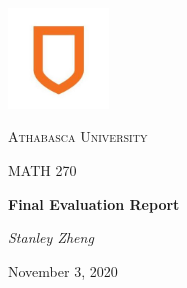 \documentclass[12pt, letterpaper, twoside]{article}
\begin{document}
\begin{titlepage}
\centering
\vspace*{60px}
\hspace{0pt}
\includegraphics[width=0.2\textwidth]{logo}\par\vspace{1cm}
{\scshape\LARGE Athabasca University \par}
\vspace{1cm}
{\scshape\Large MATH 270\par}
\vspace{1.5cm}
{\huge\bfseries Final Evaluation Report\par}
\vspace{2cm}
{\Large\itshape Stanley Zheng  \par}
\vfill
{\large November 3, 2020\par}
\vspace*{50px}
\hspace{0pt}
\pagebreak
\end{titlepage}
\end{document}
